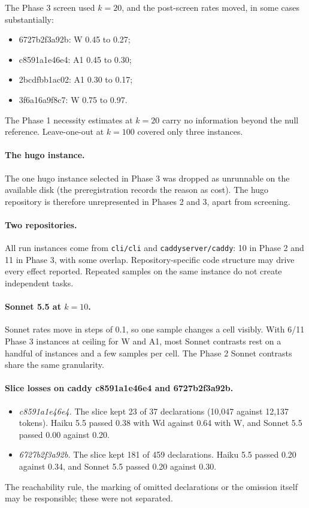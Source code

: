 \documentclass[10pt]{article}
\begin{document}
The Phase 3 screen used $k=20$, and the post-screen rates moved, in some cases substantially:
\begin{itemize}
\item 6727b2f3a92b: W 0.45 to 0.27;
\item c8591a1e46e4: A1 0.45 to 0.30;
\item 2bcdfbb1ac02: A1 0.30 to 0.17;
\item 3f6a16a9f8c7: W 0.75 to 0.97.
\end{itemize}

The Phase 1 necessity estimates at $k=20$ carry no information beyond the null reference. Leave-one-out at $k=100$ covered only three instances.

\paragraph{The hugo instance.} The one hugo instance selected in Phase 3 was dropped as unrunnable on the available disk (the preregistration records the reason as cost). The hugo repository is therefore unrepresented in Phases 2 and 3, apart from screening.

\paragraph{Two repositories.} All run instances come from \texttt{cli/cli} and \texttt{caddyserver/caddy}: 10 in Phase 2 and 11 in Phase 3, with some overlap. Repository-specific code structure may drive every effect reported. Repeated samples on the same instance do not create independent tasks.

\paragraph{Sonnet 5.5 at $k=10$.} Sonnet rates move in steps of 0.1, so one sample changes a cell visibly. With 6/11 Phase 3 instances at ceiling for W and A1, most Sonnet contrasts rest on a handful of instances and a few samples per cell. The Phase 2 Sonnet contrasts share the same granularity.

\paragraph{Slice losses on caddy c8591a1e46e4 and 6727b2f3a92b.}
\begin{itemize}
\item \emph{c8591a1e46e4.} The slice kept 23 of 37 declarations (10,047 against 12,137 tokens). Haiku 5.5 passed 0.38 with Wd against 0.64 with W, and Sonnet 5.5 passed 0.00 against 0.20.
\item \emph{6727b2f3a92b.} The slice kept 181 of 459 declarations. Haiku 5.5 passed 0.20 against 0.34, and Sonnet 5.5 passed 0.20 against 0.30.
\end{itemize}
The reachability rule, the marking of omitted declarations or the omission itself may be responsible; these were not separated.
\end{document}

